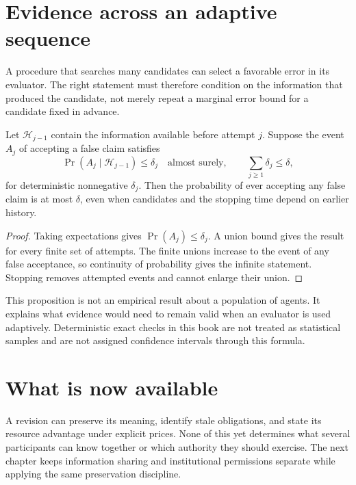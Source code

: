 \section{Evidence across an adaptive sequence}
A procedure that searches many candidates can select a favorable error in its evaluator. The right statement must therefore condition on the information that produced the candidate, not merely repeat a marginal error bound for a candidate fixed in advance.

\begin{Coreproposition}\label{Core:r:lineage}
Let $\mathcal H_{j-1}$ contain the information available before attempt $j$. Suppose the event $A_j$ of accepting a false claim satisfies
\[
\Pr(A_j\mid\mathcal H_{j-1})\le\delta_j\quad\text{almost surely},
\qquad\sum_{j\ge1}\delta_j\le\delta,
\]
for deterministic nonnegative $\delta_j$. Then the probability of ever accepting any false claim is at most $\delta$, even when candidates and the stopping time depend on earlier history.
\end{Coreproposition}
\begin{proof}
Taking expectations gives $\Pr(A_j)\le\delta_j$. A union bound gives the result for every finite set of attempts. The finite unions increase to the event of any false acceptance, so continuity of probability gives the infinite statement. Stopping removes attempted events and cannot enlarge their union.
\end{proof}

This proposition is not an empirical result about a population of agents. It explains what evidence would need to remain valid when an evaluator is used adaptively. Deterministic exact checks in this book are not treated as statistical samples and are not assigned confidence intervals through this formula.

\section*{What is now available}
A revision can preserve its meaning, identify stale obligations, and state its resource advantage under explicit prices. None of this yet determines what several participants can know together or which authority they should exercise. The next chapter keeps information sharing and institutional permissions separate while applying the same preservation discipline.


